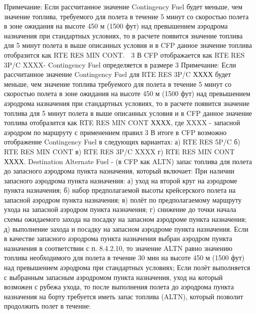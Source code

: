 Примечание: Если рассчитанное значение Contingency Fuel будет меньше, чем значение топлива, требуемого для полета в течение 5 минут со скоростью полета в зоне ожидания на высоте 450 м (1500 фут) над превышением аэродрома назначения при стандартных условиях, то в расчете появится значение топлива для 5 минут полета в выше описанных условия и в CFP данное значение топлива отобразится как RTE RES MIN CONT. 
 3%
В CFP отображается как RTE RES 3P/C XXXX- Contingency Fuel определяется в размере 3%
Примечание: Если рассчитанное значение Contingency Fuel для RTE RES 3P/C ХХХХ будет меньше, чем значение топлива требуемого для полета в течение 5 минут со скоростью полета в зоне ожидания на высоте 450 м (1500 фут) над превышением аэродрома назначения при стандартных условиях, то в расчете появится значение топлива для 5 минут полета в выше описанных условия и в CFP данное значение топлива отобразится как RTE RES MIN CONT ХХХХ, где XXXX - запасной аэродром по маршруту с применением правил 3%
В итоге в CFP возможно отображение Contingency Fuel в следующих вариантах: 
а)	RTE RES 5P/C 
б)	RTE RES MIN CONT 
в)	RTE RES 3P/C XXXX 
г)	RTE RES MIN CONT ХХХХ.
Destination Alternate Fuel - (в CFP как ALTN) запас топлива для полета до запасного аэродрома пункта назначения, который включает: 
При наличии запасного аэродрома пункта назначения: 
а)	уход на второй круг на аэродроме пункта назначения; 
б)	набор предполагаемой высоты крейсерского полета на запасной аэродром пункта назначения; 
в)	полёт по предполагаемому маршруту ухода на запасной аэродром пункта назначения; 
г)	снижение до точки начала схемы ожидаемого захода на посадку на запасном аэродроме пункта назначения; 
д)	выполнение захода и посадку на запасном аэродроме пункта назначения. 
Если в качестве запасного аэродрома пункта назначения выбран аэродром пункта назначения в соответствии с п. 8.4.2.10, то значение ALTN равно значению топлива необходимого для полета в течение 30 мин на высоте 450 м (1500 фут) над превышением аэродрома при стандартных условиях; 
Если полёт выполняется с выбранным запасным аэродромом пункта назначения, уход на который возможен с рубежа ухода, то после выполнения полета до аэродрома пункта назначения на борту требуется иметь запас топлива (ALTN), который позволит продолжить полет в течение: 
